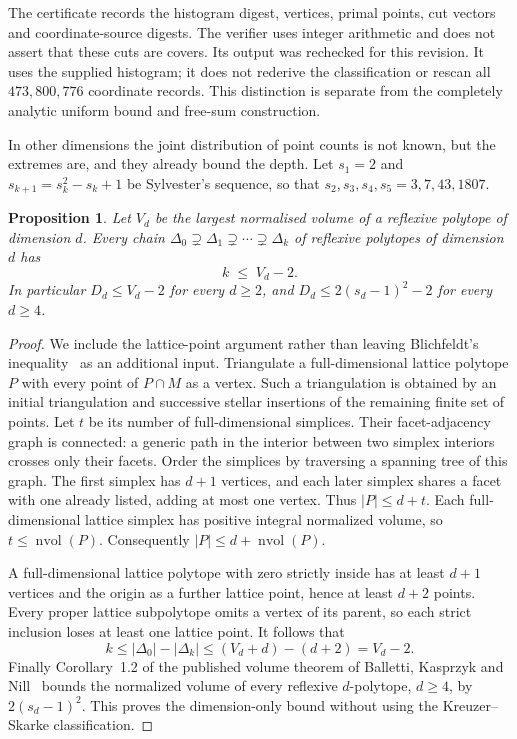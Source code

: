 \documentclass[manuscript]{aomart}
\newtheorem{proposition}[theorem]{Proposition}
\theoremstyle{definition}
\theoremstyle{remark}
\newcommand{\nvol}{\operatorname{nvol}}
\begin{document}
The certificate records the histogram digest, vertices, primal points,
cut vectors and coordinate-source digests. The verifier uses integer
arithmetic and does not assert that these cuts are covers. Its output
was rechecked for this revision. It uses the supplied histogram; it
does not rederive the classification or rescan all $473{,}800{,}776$
coordinate records. This distinction is separate from the completely
analytic uniform bound and free-sum construction.

In other dimensions the joint distribution of point counts is not known,
but the extremes are, and they already bound the depth. Let
$s_1=2$ and $s_{k+1}=s_k^2-s_k+1$ be Sylvester's sequence, so that
$s_2,s_3,s_4,s_5=3,7,43,1807$.

\begin{proposition}\label{prop:everydim}
Let $V_d$ be the largest normalised volume of a reflexive polytope of
dimension $d$. Every chain
$\Delta_0\supsetneq\Delta_1\supsetneq\cdots\supsetneq\Delta_k$ of
reflexive polytopes of dimension $d$ has
\[
k\;\le\;V_d-2 .
\]
In particular $D_d\le V_d-2$ for every $d\ge2$, and
$D_d\le2(s_d-1)^2-2$ for every $d\ge4$.
\end{proposition}

\begin{proof}
We include the lattice-point argument rather than leaving Blichfeldt's
inequality~\cite{Bli14} as an additional input. Triangulate a
full-dimensional lattice polytope $P$ with every point of $P\cap M$ as
a vertex. Such a triangulation is obtained by an initial triangulation
and successive stellar insertions of the remaining finite set of points.
Let $t$ be its number of full-dimensional simplices. Their facet-adjacency
graph is connected: a generic path in the interior between two simplex
interiors crosses only their facets. Order the simplices by traversing
a spanning tree of this graph. The first simplex has $d+1$ vertices,
and each later simplex shares a facet with one already listed, adding
at most one vertex. Thus $|P|\le d+t$. Each full-dimensional lattice
simplex has positive integral normalized volume, so
$t\le\nvol(P)$. Consequently $|P|\le d+\nvol(P)$.

A full-dimensional lattice polytope with zero strictly inside has at
least $d+1$ vertices and the origin as a further lattice point, hence
at least $d+2$ points. Every proper lattice subpolytope omits a vertex
of its parent, so each strict inclusion loses at least one lattice
point. It follows that
\[
 k\le |\Delta_0|-|\Delta_k|
 \le (V_d+d)-(d+2)=V_d-2.
\]
Finally Corollary~1.2 of the published volume theorem of Balletti,
Kasprzyk and Nill~\cite{BKN22} bounds the normalized volume of every
reflexive $d$-polytope, $d\ge4$, by $2(s_d-1)^2$. This proves the
dimension-only bound without using the Kreuzer--Skarke classification.
\end{proof}
\end{document}
